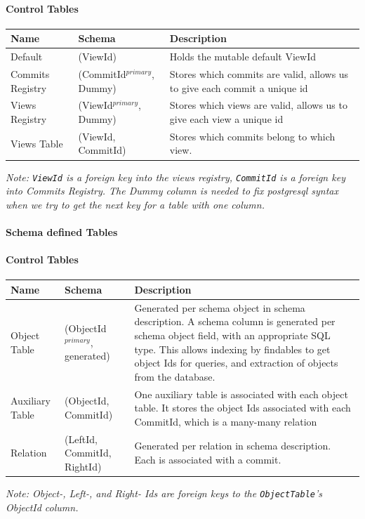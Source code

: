 \documentclass[12pt,a4paper,twoside,openright]{report}
\newcommand\codeName[1]{\texttt{#1}}
\newcommand\note[1]{\textit{#1}}
\let\oldparagraph\paragraph
\renewcommand{\paragraph}[1]{\oldparagraph{#1}\mbox{}}
\begin{document}
		\paragraph{Control Tables}
		\begin{center}
			\begin{tabular}{|p{4cm}||p{4cm}|p{4cm}|} \hline
			Name & Schema & Description \\ \hline
			Default & (ViewId) & Holds the mutable default ViewId \\ \hline
			Commits Registry & (CommitId$^{primary}$, Dummy) & Stores which commits are valid, allows us to give each commit a unique id \\ \hline
			Views Registry & (ViewId$^{primary}$, Dummy) & Stores which views are valid, allows us to give each view a unique id \\ \hline
			Views Table & (ViewId, CommitId) & Stores which commits belong to which view. \\ \hline
			\end{tabular}
		\end{center}
\note{Note: \codeName{ViewId} is a foreign key into the views registry, \codeName{CommitId} is a foreign key into Commits Registry. The Dummy column is needed to fix postgresql syntax when we try to get the next key for a table with one column.}		
		
		\paragraph{Schema defined Tables}
				\paragraph{Control Tables}
		\begin{center}
			\begin{tabular}{|p{4cm}||p{4cm}|p{4cm}|} \hline
			Name & Schema & Description \\ \hline
			Object Table & (ObjectId$^{primary}$, generated) & Generated per schema object in schema description. A schema column is generated per schema object field, with an appropriate SQL type. This allows indexing by findables to get object Ids for queries, and extraction of objects from the database. \\ \hline
			Auxiliary Table & (ObjectId, CommitId) & One auxiliary table is associated with each object table. It stores the object Ids associated with each CommitId, which is a many-many relation \\ \hline
			Relation & (LeftId, CommitId, RightId) & Generated per relation in schema description. Each is associated with a commit.  \\ \hline
			\end{tabular}
		\end{center}
		\note{Note: Object-, Left-, and Right- Ids are foreign keys to the \codeName{ObjectTable}'s ObjectId column.}
\end{document}
